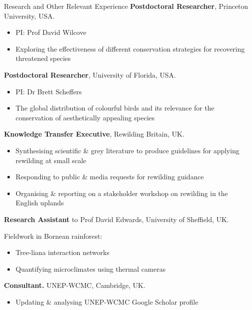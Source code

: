 \renewcommand\labelitemi{$\diamond$}

\begin{rubric}{Research and Other Relevant Experience}
%
	\textbf{Postdoctoral Researcher}, Princeton University, USA.
	\begin{itemize}[topsep=0pt,itemsep=-1ex,partopsep=1ex,parsep=1ex]
	\item PI: Prof David Wilcove
	\item Exploring the effectiveness of different conservation strategies for recovering threatened species
	\end{itemize}
\entry*[2019]%
	\textbf{Postdoctoral Researcher}, University of Florida, USA.
	\begin{itemize}[topsep=0pt,itemsep=-1ex,partopsep=1ex,parsep=1ex]
	\item PI: Dr Brett Scheffers
	\item The global distribution of colourful birds and its relevance for the conservation of aesthetically appealing species
	\end{itemize}
\entry*[2016]%
	\textbf{Knowledge Transfer Executive}, Rewilding Britain, UK.
	\begin{itemize}[topsep=0pt,itemsep=-1ex,partopsep=1ex,parsep=1ex]
	\item Synthesising scientific \& grey literature to produce guidelines for applying rewilding at small scale
	\item Responding to public \& media requests for rewilding guidance
	\item Organising \& reporting on a stakeholder workshop on rewilding in the English uplands \parencite{sandom_rewilding_2018}
	\end{itemize}
\entry*[2014]%
	\textbf{Research Assistant} to Prof David Edwards, University of Sheffield, UK.
	\par Fieldwork in Bornean rainforest:
	\begin{itemize}[topsep=0pt,itemsep=-1ex,partopsep=1ex,parsep=1ex]
	\item Tree-liana interaction networks \parencite{magrach_selective_2016}
	\item Quantifying microclimates using thermal cameras \parencite{scheffers_extreme_2017}
	\end{itemize}
\entry*[2013 -- 2014]%
	\textbf{Consultant.} UNEP-WCMC, Cambridge, UK.
	\begin{itemize}[topsep=0pt,itemsep=-1ex,partopsep=1ex,parsep=1ex]
	\item Updating \& analysing UNEP-WCMC Google Scholar profile

\end{itemize}
\end{rubric}
